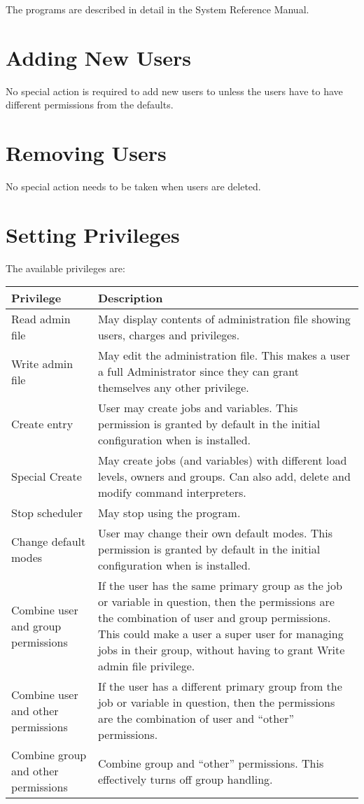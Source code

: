 The programs are described in detail in the System Reference Manual.

\section{Adding New Users}
No special action is required to add new users to \ProductName{} unless the users have to have different permissions from the defaults.

\section{Removing Users}
No special action needs to be taken when users are deleted.

\section{Setting Privileges}
The available privileges are:

\begin{tabular}{|l | p{10cm}|}
\hline
\bfseries Privilege &
\bfseries Description\\\hline
Read admin file &
May display contents of administration file showing users,
charges and privileges.\\\hline
Write admin file &
May edit the administration file. This makes a user a full
\ProductName{} Administrator since they can grant themselves any other
privilege.\\\hline
Create entry &
User may create jobs and variables. This permission is granted
by default in the initial configuration when \ProductName{} is
installed.\\\hline
Special Create &
 May create jobs (and variables) with different load levels,
owners and groups. Can also add, delete and modify command
interpreters.\\\hline
Stop scheduler &
May stop \ProductName{} using the \PrBtquit{}
program.\\\hline
Change default modes &
User may change their own default modes. This permission is
granted by default in the initial configuration when \ProductName{} is
installed.\\\hline
Combine user and group permissions &
If the user has the same primary group as the job or variable
in question, then the permissions are the combination of user and group
permissions.\newline
This could make a user a super user for managing jobs in their group,
without having to grant Write admin file privilege.\\\hline
Combine user and other permissions &
If the user has a different primary group from the job or
variable in question, then the permissions are the combination of user
and ``other'' permissions.\\\hline
Combine group and other permissions &
Combine group and ``other'' permissions. This effectively turns off group handling.\\\hline
\end{tabular}

